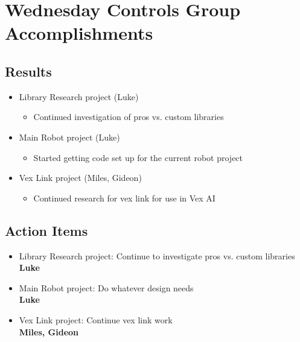\section{Wednesday Controls Group Accomplishments}

\subsection{Results}
\begin{itemize}
    \item Library Research project (Luke)
    \begin{itemize}
        \item Continued investigation of pros vs. custom libraries
    \end{itemize}
    \item Main Robot project (Luke)
    \begin{itemize}
        \item Started getting code set up for the current robot project
    \end{itemize}
    \item Vex Link project (Miles, Gideon)
    \begin{itemize}
        \item Continued research for vex link for use in Vex AI
    \end{itemize}
\end{itemize}

\subsection{Action Items}
\begin{itemize}
    \item Library Research project: Continue to investigate pros vs. custom libraries\\
    \textbf{Luke}
    \item Main Robot project: Do whatever design needs\\
    \textbf{Luke}
    \item Vex Link project: Continue vex link work\\
    \textbf{Miles, Gideon}
\end{itemize}
